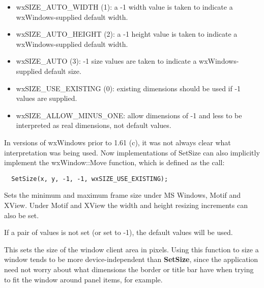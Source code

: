 \begin{itemize}
\itemsep=0pt
\item wxSIZE\_AUTO\_WIDTH (1): a -1 width value is taken to indicate
a wxWindows-supplied default width.
\item wxSIZE\_AUTO\_HEIGHT (2): a -1 height value is taken to indicate
a wxWindows-supplied default width.
\item wxSIZE\_AUTO (3): -1 size values are taken to indicate
a wxWindows-supplied default size.
\item wxSIZE\_USE\_EXISTING (0): existing dimensions should be used
if -1 values are supplied.
\item wxSIZE\_ALLOW\_MINUS\_ONE: allow dimensions of -1 and less to be interpreted
as real dimensions, not default values.
\end{itemize}

In versions of wxWindows prior to 1.61 (c), it was not always
clear what interpretation was being used. Now implementations
of SetSize can also implicitly implement the wxWindow::Move function,
which is defined as the call:

\begin{verbatim}
  SetSize(x, y, -1, -1, wxSIZE_USE_EXISTING);
\end{verbatim}



Sets the minimum and maximum frame size under MS Windows, Motif and XView. Under Motif and XView
the width and height resizing increments can also be set.

If a pair of values is not set (or set to -1), the default values will be used.



This sets the size of the window client area in pixels. Using this function to size a window
tends to be more device-independent than {\bf SetSize}, since the application need not
worry about what dimensions the border or title bar have when trying to fit the window
around panel items, for example.



